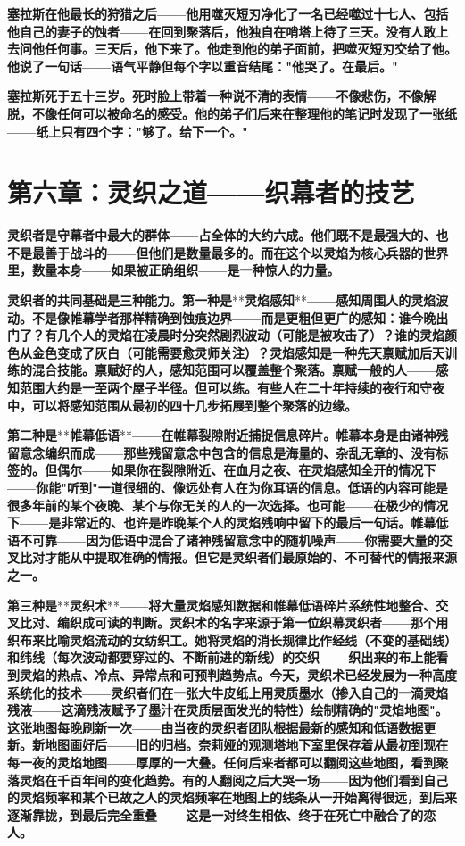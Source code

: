\documentclass[12pt,a4paper,openany]{ctexbook}
\begin{document}
\textbf{塞拉斯在他最长的狩猎之后——他用噬灭短刃净化了一名已经噬过十七人、包括他自己的妻子的蚀者——在回到聚落后，他独自在哨塔上待了三天。没有人敢上去问他任何事。三天后，他下来了。他走到他的弟子面前，把噬灭短刃交给了他。他说了一句话——语气平静但每个字以重音结尾："他哭了。在最后。"}


\textbf{塞拉斯死于五十三岁。死时脸上带着一种说不清的表情——不像悲伤，不像解脱，不像任何可以被命名的感受。他的弟子们后来在整理他的笔记时发现了一张纸——纸上只有四个字："够了。给下一个。"}


\section*{第六章：灵织之道——织幕者的技艺}


\textbf{灵织者是守幕者中最大的群体——占全体的大约六成。他们既不是最强大的、也不是最善于战斗的——但他们是数量最多的。而在这个以灵焰为核心兵器的世界里，数量本身——如果被正确组织——是一种惊人的力量。}


\textbf{灵织者的共同基础是三种能力。第一种是}**\textbf{灵焰感知}**\textbf{——感知周围人的灵焰波动。不是像帷幕学者那样精确到蚀痕边界——而是更粗但更广的感知：谁今晚出门了？有几个人的灵焰在凌晨时分突然剧烈波动（可能是被攻击了）？谁的灵焰颜色从金色变成了灰白（可能需要愈灵师关注）？灵焰感知是一种先天禀赋加后天训练的混合技能。禀赋好的人，感知范围可以覆盖整个聚落。禀赋一般的人——感知范围大约是一至两个屋子半径。但可以练。有些人在二十年持续的夜行和守夜中，可以将感知范围从最初的四十几步拓展到整个聚落的边缘。}


\textbf{第二种是}**\textbf{帷幕低语}**\textbf{——在帷幕裂隙附近捕捉信息碎片。帷幕本身是由诸神残留意念编织而成——那些残留意念中包含的信息是海量的、杂乱无章的、没有标签的。但偶尔——如果你在裂隙附近、在血月之夜、在灵焰感知全开的情况下——你能"听到"一道很细的、像远处有人在为你耳语的信息。低语的内容可能是很多年前的某个夜晚、某个与你无关的人的一次选择。也可能——在极少的情况下——是非常近的、也许是昨晚某个人的灵焰残响中留下的最后一句话。帷幕低语不可靠——因为低语中混合了诸神残留意念中的随机噪声——你需要大量的交叉比对才能从中提取准确的情报。但它是灵织者们最原始的、不可替代的情报来源之一。}


\textbf{第三种是}**\textbf{灵织术}**\textbf{——将大量灵焰感知数据和帷幕低语碎片系统性地整合、交叉比对、编织成可读的判断。灵织术的名字来源于第一位织幕灵织者——那个用织布来比喻灵焰流动的女纺织工。她将灵焰的消长规律比作经线（不变的基础线）和纬线（每次波动都要穿过的、不断前进的新线）的交织——织出来的布上能看到灵焰的热点、冷点、异常点和可预判趋势点。今天，灵织术已经发展为一种高度系统化的技术——灵织者们在一张大牛皮纸上用灵质墨水（掺入自己的一滴灵焰残液——这滴残液赋予了墨汁在灵质层面发光的特性）绘制精确的"灵焰地图"。这张地图每晚刷新一次——由当夜的灵织者团队根据最新的感知和低语数据更新。新地图画好后——旧的归档。奈莉娅的观测塔地下室里保存着从最初到现在每一夜的灵焰地图——厚厚的一大叠。任何后来者都可以翻阅这些地图，看到聚落灵焰在千百年间的变化趋势。有的人翻阅之后大哭一场——因为他们看到自己的灵焰频率和某个已故之人的灵焰频率在地图上的线条从一开始离得很远，到后来逐渐靠拢，到最后完全重叠——这是一对终生相依、终于在死亡中融合了的恋人。}
\end{document}
